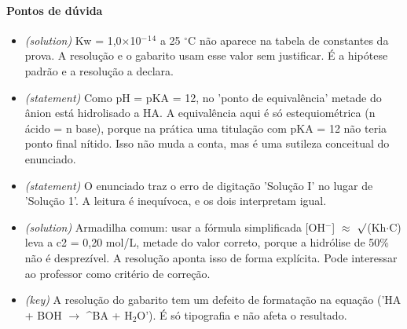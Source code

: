 \documentclass{article}%
\begin{document}
\paragraph{Pontos de dúvida}%
\begin{itemize}%
\item%
\textit{(solution)} Kw = 1,0$\times$10$^{-}$$^{1}$$^{4}$ a 25 $^\circ$C não aparece na tabela de constantes da prova. A resolução e o gabarito usam esse valor sem justificar. É a hipótese padrão e a resolução a declara.%
\item%
\textit{(statement)} Como pH = pKA = 12, no 'ponto de equivalência' metade do ânion está hidrolisado a HA. A equivalência aqui é só estequiométrica (n ácido = n base), porque na prática uma titulação com pKA = 12 não teria ponto final nítido. Isso não muda a conta, mas é uma sutileza conceitual do enunciado.%
\item%
\textit{(statement)} O enunciado traz o erro de digitação 'Solução I' no lugar de 'Solução 1'. A leitura é inequívoca, e os dois interpretam igual.%
\item%
\textit{(solution)} Armadilha comum: usar a fórmula simplificada {[}OH$^{-}${]} $\approx$ $\surd$(Kh$\cdot$C) leva a c2 = 0,20 mol/L, metade do valor correto, porque a hidrólise de 50\% não é desprezível. A resolução aponta isso de forma explícita. Pode interessar ao professor como critério de correção.%
\item%
\textit{(key)} A resolução do gabarito tem um defeito de formatação na equação ('HA + BOH $\to$ \^{}BA + H$_{2}$O'). É só tipografia e não afeta o resultado.%
\end{itemize}%
\end{document}
